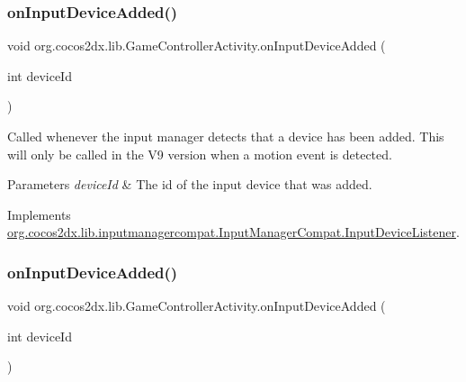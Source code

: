 \subsubsection{\texorpdfstring{on\+Input\+Device\+Added()}{onInputDeviceAdded()}\hspace{0.1cm}{\footnotesize\ttfamily [1/2]}}
{\footnotesize\ttfamily void org.\+cocos2dx.\+lib.\+Game\+Controller\+Activity.\+on\+Input\+Device\+Added (\begin{DoxyParamCaption}\item[{int}]{device\+Id }\end{DoxyParamCaption})\hspace{0.3cm}{\ttfamily [inline]}}

Called whenever the input manager detects that a device has been added. This will only be called in the V9 version when a motion event is detected.


\begin{DoxyParams}{Parameters}
{\em device\+Id} & The id of the input device that was added. \\
\hline
\end{DoxyParams}


Implements \hyperlink{interfaceorg_1_1cocos2dx_1_1lib_1_1inputmanagercompat_1_1InputManagerCompat_1_1InputDeviceListener_aade58bcb9003c24590ac0907d66406dc}{org.\+cocos2dx.\+lib.\+inputmanagercompat.\+Input\+Manager\+Compat.\+Input\+Device\+Listener}.

\mbox{\label{classorg_1_1cocos2dx_1_1lib_1_1GameControllerActivity_a25ed4cb26b6bac381d1befce69f7e638}} 
\subsubsection{\texorpdfstring{on\+Input\+Device\+Added()}{onInputDeviceAdded()}\hspace{0.1cm}{\footnotesize\ttfamily [2/2]}}
{\footnotesize\ttfamily void org.\+cocos2dx.\+lib.\+Game\+Controller\+Activity.\+on\+Input\+Device\+Added (\begin{DoxyParamCaption}\item[{int}]{device\+Id }\end{DoxyParamCaption})\hspace{0.3cm}{\ttfamily [inline]}}


